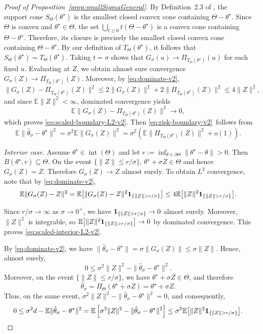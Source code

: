 \documentclass[11pt]{article}
\theoremstyle{plain}
\theoremstyle{definition}
\newcommand{\indicator}{{\bf{1}}}
\newcommand{\E}{\mathbb{E}}
\newcommand{\hattheta}{\hat{\theta}}
\begin{document}
\begin{proof}[Proof of Proposition~\ref{prop:smallSigmaGeneral}]
By Definition~2.3 of \cite{zarantonello1971projections}, the
support cone $S_\Theta(\theta^\star)$ is the smallest closed convex cone
containing $\Theta-\theta^\star$. Since $\Theta$ is convex and $\theta^\star\in\Theta$, the set
$\bigcup_{t\ge0}t(\Theta-\theta^\star)$ is a convex cone containing
$\Theta-\theta^\star$. Therefore, its closure is precisely the smallest
closed convex cone containing $\Theta-\theta^\star$. By our definition of $T_\Theta(\theta^\star)$, it follows that $S_\Theta(\theta^\star)=T_\Theta(\theta^\star)$.
Taking $t=\sigma$ shows that $G_\sigma(u)\to\Pi_{T_\Theta(\theta^\star)}(u)$
for each fixed $u$. Evaluating at $Z$, we obtain almost sure convergence
$G_\sigma(Z)\to\Pi_{T_\Theta(\theta^\star)}(Z)$. Moreover, by \eqref{eq:dominate-v2},
\[
\|G_\sigma(Z)-\Pi_{T_\Theta(\theta^\star)}(Z)\|^2
\le
2\|G_\sigma(Z)\|^2+2\|\Pi_{T_\Theta(\theta^\star)}(Z)\|^2
\le
4\|Z\|^2,
\]
and since $\E\|Z\|^2<\infty$, dominated convergence yields
\[
\E\|G_\sigma(Z)-\Pi_{T_\Theta(\theta^\star)}(Z)\|^2\to0,
\]
which proves \eqref{eq:scaled-boundary-L2-v2}.
Then \eqref{eq:risk-boundary-v2}~follows from
\[
\E\|\hattheta_\sigma-\theta^\star\|^2
=\sigma^2\E\|G_\sigma(Z)\|^2
=\sigma^2(\E\|\Pi_{T_\Theta(\theta^\star)}(Z)\|^2+o(1)).
\]

\noindent\textit{Interior case.}
Assume $\theta^\star\in\operatorname{int}(\Theta)$ and let $ r:=\inf_{\theta\in\partial\Theta}\|\theta^\star-\theta\|>0$. Then $B(\theta^\star,r) \subseteq \Theta$.
On the event $\{\|Z\|\le r/\sigma\}$, $\theta^\star+\sigma Z\in\Theta$ and hence $G_\sigma(Z)=Z$.
Therefore $G_\sigma(Z)\to Z$ almost surely. To obtain $L^2$ convergence, note that by \eqref{eq:dominate-v2},
\[
\E\|G_\sigma(Z)-Z\|^2
=
\E\big[\|G_\sigma(Z)-Z\|^2\indicator_{\{\|Z\|>r/\sigma\}}\big]
\le
4\E\big[\|Z\|^2\indicator_{\{\|Z\|>r/\sigma\}}\big].
\]

Since $r/\sigma\to\infty$ as $\sigma\to0^+$, we have
$\indicator_{\{\|Z\|>r/\sigma\}}\to0$ almost surely. Moreover, $\|Z\|^2$ is
integrable, so  $\E\big[\|Z\|^2\indicator_{\{\|Z\|>r/\sigma\}}\big]\to0$ by dominated convergence. This proves \eqref{eq:scaled-interior-L2-v2}. 


By \eqref{eq:dominate-v2}, we have $\|\hattheta_\sigma-\theta^\star\|
    =
    \sigma\|G_\sigma(Z)\|
    \le
    \sigma\|Z\|$. Hence, almost surely, 
\[
    0
    \le
    \sigma^2\|Z\|^2-\|\hattheta_\sigma-\theta^\star\|^2.
\]
Moreover, on the event $\{\|Z\|\le r/\sigma\}$, we have
$\theta^\star+\sigma Z\in\Theta$, and therefore
\[
    \hattheta_\sigma
    =
    \Pi_\Theta(\theta^\star+\sigma Z)
    =
    \theta^\star+\sigma Z.
\]
Thus, on the same event, $\sigma^2\|Z\|^2-\|\hattheta_\sigma-\theta^\star\|^2 = 0$, and consequently,
\begin{align*}
0
\le
\sigma^2 d-\E\|\hattheta_\sigma-\theta^\star\|^2 
=
\E\left[
    \sigma^2\|Z\|^2-\|\hattheta_\sigma-\theta^\star\|^2
\right] 
\le
\sigma^2
\E\big[\|Z\|^2\indicator_{\{\|Z\|>r/\sigma\}}\big].
\end{align*}


\end{proof}
\end{document}
